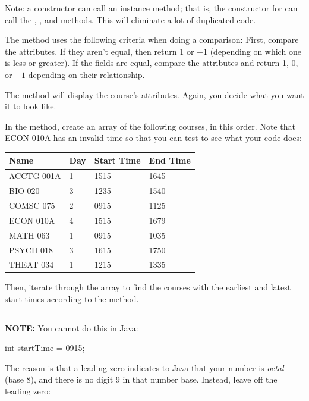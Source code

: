 \begin{exercise}
Note: a constructor can call an instance method; that is, the constructor for  can call the , , and  methods. This will eliminate a lot of duplicated code.

The  method uses the following criteria when doing a comparison: First, compare the  attributes. If they aren't equal, then return 1 or $-1$ (depending on which one is less or greater). If the  fields are equal, compare the  attributes and return 1, 0, or $-1$ depending on their relationship.

The  method will display the course's attributes. Again, you decide what you want it to look like.

In the  method, create an array of the following courses, in this order. Note that ECON 010A has an invalid time so that you can test to see what your code does:

\begin{tabular}{|l|l|l|l|}
\hline
Name & Day & Start Time & End Time \\ \hline
ACCTG 001A & 1 & 1515 & 1645 \\ \hline
BIO 020 & 3 & 1235 & 1540 \\ \hline
COMSC 075 & 2 & 0915 & 1125 \\ \hline
ECON 010A & 4 & 1515 & 1679 \\ \hline
MATH 063 & 1 & 0915 & 1035 \\ \hline
PSYCH 018 & 3 & 1615 & 1750 \\ \hline
THEAT 034 & 1 & 1215 & 1335\\ \hline
\end{tabular}

Then, iterate through the array to find the courses with the earliest and latest start times according to the  method.

\begin{minipage}[t]{0.8\textwidth}

\noindent\rule{\textwidth}{1pt}

{\bf NOTE:} You cannot do this in Java:
\begin{code}
int startTime = 0915;
\end{code}

The reason is that a leading zero indicates to Java that your number is {\em octal} (base 8), and there is no digit 9 in that number base. Instead, leave off the leading zero:


\end{minipage}
\end{exercise}
